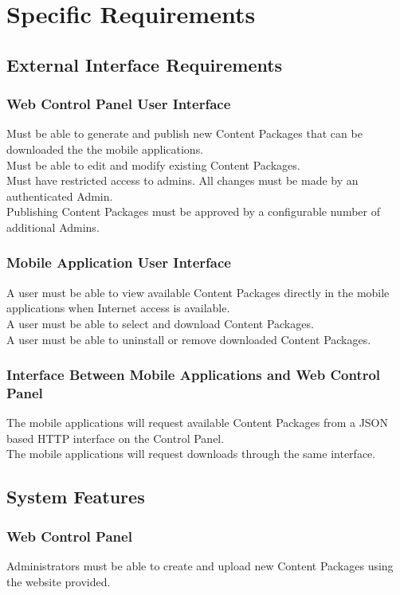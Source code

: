 \documentclass[letterpaper, 10pt,titlepage]{article}
\begin{document}
\section{Specific Requirements}
\subsection{External Interface Requirements}
\subsubsection{Web Control Panel User Interface}
Must be able to generate and publish new Content Packages that can be downloaded the the mobile applications.\\
Must be able to edit and modify existing Content Packages.\\
Must have restricted access to admins. All changes must be made by an authenticated Admin.\\
Publishing Content Packages must be approved by a configurable number of additional Admins.

\subsubsection{Mobile Application User Interface}
A user must be able to view available Content Packages directly in the mobile applications when Internet access is available. \\
A user must be able to select and download Content Packages.\\
A user must be able to uninstall or remove downloaded Content Packages.

\subsubsection{Interface Between Mobile Applications and Web Control Panel}
The mobile applications will request available Content Packages from a JSON based HTTP interface on the Control Panel. \\
The mobile applications will request downloads through the same interface.


\subsection{System Features}
\subsubsection{Web Control Panel}
Administrators must be able to create and upload new Content Packages using the website provided.
\end{document}
